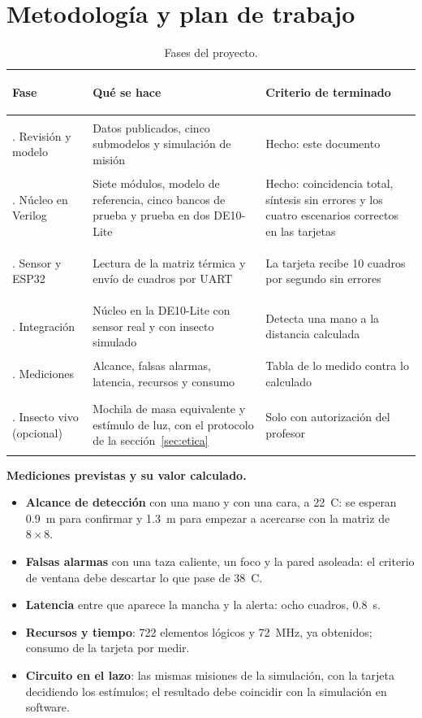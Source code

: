 \section{Metodología y plan de trabajo}

\begin{table}[H]
\centering\footnotesize
\caption{Fases del proyecto.}
\label{tab:fases}
\begin{tabularx}{\textwidth}{@{}>{\bfseries\raggedright\arraybackslash}p{3.3cm} >{\raggedright\arraybackslash}X >{\raggedright\arraybackslash}p{4.5cm}@{}}
\toprule
\rowcolor{TableHead} Fase & Qué se hace & Criterio de terminado \\
\midrule
1. Revisión y modelo & Datos publicados, cinco submodelos y simulación de misión & Hecho: este documento \\
2. Núcleo en Verilog & Siete módulos, modelo de referencia, cinco bancos de prueba y prueba en dos DE10-Lite & Hecho: coincidencia total, síntesis sin errores y los cuatro escenarios correctos en las tarjetas \\
3. Sensor y ESP32 & Lectura de la matriz térmica y envío de cuadros por UART & La tarjeta recibe 10 cuadros por segundo sin errores \\
4. Integración & Núcleo en la DE10-Lite con sensor real y con insecto simulado & Detecta una mano a la distancia calculada \\
5. Mediciones & Alcance, falsas alarmas, latencia, recursos y consumo & Tabla de lo medido contra lo calculado \\
6. Insecto vivo (opcional) & Mochila de masa equivalente y estímulo de luz, con el protocolo de la sección~\ref{sec:etica} & Solo con autorización del profesor \\
\bottomrule
\end{tabularx}
\end{table}

\textbf{Mediciones previstas y su valor calculado.}
\begin{itemize}
  \item \textbf{Alcance de detección} con una mano y con una cara, a 22~\textdegree C: se esperan 0.9~m para
        confirmar y 1.3~m para empezar a acercarse con la matriz de $8\times8$.
  \item \textbf{Falsas alarmas} con una taza caliente, un foco y la pared asoleada: el criterio de ventana
        debe descartar lo que pase de 38~\textdegree C.
  \item \textbf{Latencia} entre que aparece la mancha y la alerta: ocho cuadros, 0.8~s.
  \item \textbf{Recursos y tiempo}: 722 elementos lógicos y 72~MHz, ya obtenidos; consumo de la tarjeta por medir.
  \item \textbf{Circuito en el lazo}: las mismas misiones de la simulación, con la tarjeta decidiendo los
        estímulos; el resultado debe coincidir con la simulación en software.
\end{itemize}

